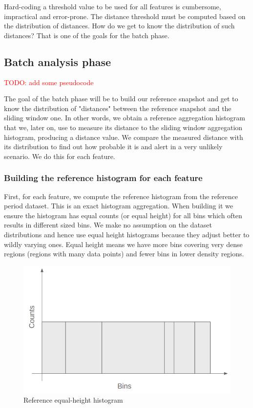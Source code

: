Hard-coding a threshold value to be used for all features is cumbersome, impractical and error-prone. The distance threshold must be computed based on the distribution of distances. How do we get to know the distribution of such distances? That is one of the goals for the batch phase.

\subsection{Batch analysis phase}
\textcolor{red}{TODO: add some pseudocode}

The goal of the batch phase will be to build our reference snapshot and get to know the distribution of "distances" between the reference snapshot and the sliding window one. In other words, we obtain a reference aggregation histogram that we, later on, use to measure its distance to the sliding window aggregation histogram, producing a distance value. We compare the measured distance with its distribution to find out how probable it is and alert in a very unlikely scenario. We do this for each feature.

\subsubsection*{Building the reference histogram for each feature}

First, for each feature, we compute the reference histogram from the reference period dataset. This is an exact histogram aggregation. When building it we ensure the histogram has equal counts (or equal height) for all bins which often results in different sized bins. We make no assumption on the dataset distributions and hence use equal height histograms because they adjust better to wildly varying ones. Equal height means we have more bins covering very dense regions (regions with many data points) and fewer bins in lower density regions. 

\begin{figure}[!htb]
    \begin{center}
      \includegraphics[scale=0.4]{figures/ref-hist.png}
      \caption[]{Reference equal-height histogram}
      \label{fig:ref-hist}
    \end{center}
\end{figure}


